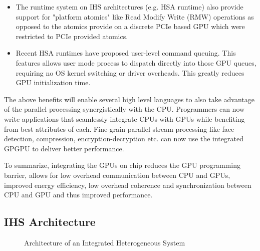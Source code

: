 \begin{itemize}
	\item The runtime system on IHS architectures (e.g. HSA runtime) also provide support for "platform atomics" like Read Modify Write (RMW) operations as opposed to the atomics provide on a discrete PCIe based GPU which were restricted to PCIe provided atomics. 
	\item Recent HSA runtimes have proposed user-level command queuing. This features allows user mode process to dispatch directly into those GPU queues, requiring no OS kernel switching or driver overheads. This greatly reduces GPU initialization time.
\end{itemize} 

The above benefits will enable several high level languages \cite{sumatra,julia} to also take advantage of the parallel processing synergistically with the CPU. Programmers can now write applications that seamlessly integrate CPUs with GPUs while benefiting from best attributes of each. Fine-grain parallel stream processing like face detection, compression, encryption-decryption etc. can now use the integrated GPGPU to deliver better performance.  
\par To summarize, integrating the GPUs on chip reduces the GPU programming barrier, allows for low overhead communication between CPU and GPUs, improved energy efficiency, low overhead coherence and synchronization between CPU and GPU and thus improved performance.

\subsection{IHS Architecture}
\begin{figure}[!htb]
	\centering
	\def\svgwidth{0.9\columnwidth}
	
	\caption{Architecture of an Integrated Heterogeneous System}
	\label{fig:hsa-arch}
\end{figure}

